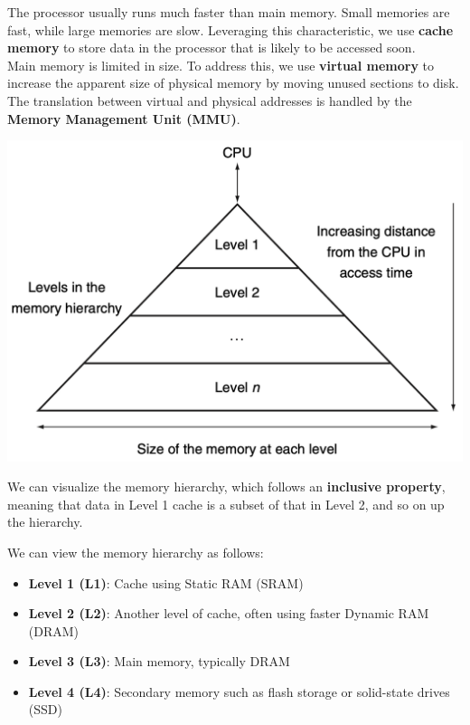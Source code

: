 \begin{minipage}{0.45\textwidth}
  The processor usually runs much faster than main memory. Small memories are fast, while large memories are slow. Leveraging this characteristic, we use \textbf{cache memory} to store data in the processor that is likely to be accessed soon. \\[5pt]
  Main memory is limited in size. To address this, we use \textbf{virtual memory} to increase the apparent size of physical memory by moving unused sections to disk. The translation between virtual and physical addresses is handled by the \textbf{Memory Management Unit (MMU)}. 
\end{minipage}
\begin{minipage}{0.5\textwidth}
  \begin{center}
  \includegraphics[width=\textwidth]{Figure/memory_struct.png}
\end{center}
\end{minipage}

We can visualize the memory hierarchy, which follows an \textbf{inclusive property}, meaning that data in Level 1 cache is a subset of that in Level 2, and so on up the hierarchy. 

We can view the memory hierarchy as follows: 
\begin{itemize}
  \item \textbf{Level 1 (L1)}: Cache using Static RAM (SRAM)
  \item \textbf{Level 2 (L2)}: Another level of cache, often using faster Dynamic RAM (DRAM)
  \item \textbf{Level 3 (L3)}: Main memory, typically DRAM
  \item \textbf{Level 4 (L4)}: Secondary memory such as flash storage or solid-state drives (SSD)
\end{itemize}

